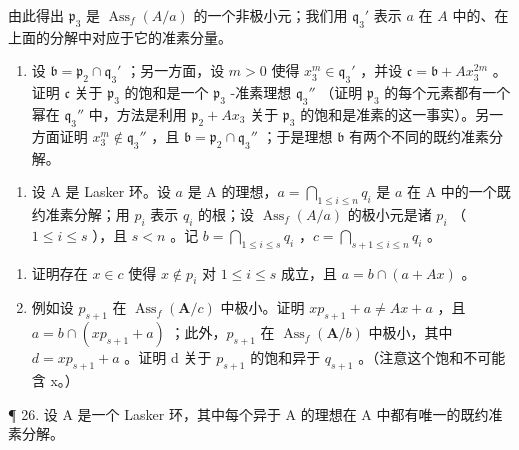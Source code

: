 由此得出 \(\mathfrak{p}_3\) 是 \(\operatorname{Ass}_f(A / a)\) 的一个非极小元；我们用 \(\mathfrak{q}_3'\) 表示 \(a\) 在 \(A\) 中的、在上面的分解中对应于它的准素分量。

\begin{enumerate}
\def\labelenumi{(\alph{enumi})}
\setcounter{enumi}{2}
\tightlist
\item
  设 \(\mathfrak{b} = \mathfrak{p}_2 \cap \mathfrak{q}_3'\) ；另一方面，设 \(m > 0\) 使得 \(x_3^m \in \mathfrak{q}_3'\) ，并设 \(\mathfrak{c} = \mathfrak{b} + Ax_3^{2m}\) 。证明 \(\mathfrak{c}\) 关于 \(\mathfrak{p}_3\) 的饱和是一个 \(\mathfrak{p}_3\) -准素理想 \(\mathfrak{q}_3''\) （证明 \(\mathfrak{p}_3\) 的每个元素都有一个幂在 \(\mathfrak{q}_3''\) 中，方法是利用 \(\mathfrak{p}_2 + Ax_3\) 关于 \(\mathfrak{p}_3\) 的饱和是准素的这一事实）。另一方面证明 \(x_3^m \notin \mathfrak{q}_3''\) ，且 \(\mathfrak{b} = \mathfrak{p}_2 \cap \mathfrak{q}_3''\) ；于是理想 \(\mathfrak{b}\) 有两个不同的既约准素分解。
\end{enumerate}

\begin{enumerate}
\def\labelenumi{\arabic{enumi}.}
\setcounter{enumi}{24}
\tightlist
\item
  设 A 是 Lasker 环。设 \(a\) 是 A 的理想，\(a = \bigcap_{1 \leqslant i \leqslant n} q_i\) 是 \(a\) 在 A 中的一个既约准素分解；用 \(p_i\) 表示 \(q_i\) 的根；设 \(\operatorname{Ass}_f(A/a)\) 的极小元是诸 \(p_i\) （ \(1 \leqslant i \leqslant s\) ），且 \(s < n\) 。记 \(b = \bigcap_{1 \leqslant i \leqslant s} q_i\) ，\(c = \bigcap_{s+1 \leqslant i \leqslant n} q_i\) 。
\end{enumerate}

\begin{enumerate}
\def\labelenumi{(\alph{enumi})}
\item
  证明存在 \(x \in c\) 使得 \(x \notin p_i\) 对 \(1 \leqslant i \leqslant s\) 成立，且 \(a = b \cap (a + Ax)\) 。
\item
  例如设 \(p_{s+1}\) 在 \(\operatorname{Ass}_{f}(\mathbf{A}/c)\) 中极小。证明 \(xp_{s+1} + a \neq Ax + a\) ，且 \(a = b \cap (xp_{s+1} + a)\) ；此外，\(p_{s+1}\) 在 \(\operatorname{Ass}_{f}(\mathbf{A}/b)\) 中极小，其中 \(d = xp_{s+1} + a\) 。证明 d 关于 \(p_{s+1}\) 的饱和异于 \(q_{s+1}\) 。（注意这个饱和不可能含 x。）
\end{enumerate}

¶ 26. 设 A 是一个 Lasker 环，其中每个异于 A 的理想在 A 中都有唯一的既约准素分解。

